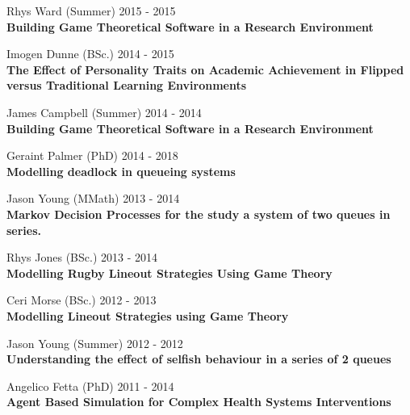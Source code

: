 \documentclass[10pt]{res} %
\begin{document}
\begin{resume}
\begin{etaremune}
\item
    Rhys Ward (Summer) \hfill 2015 -
    2015\\
\textbf{Building Game Theoretical Software in a Research Environment}\\

\item
    Imogen Dunne (BSc.) \hfill 2014 -
    2015\\
\textbf{The Effect of Personality Traits on Academic Achievement in Flipped versus Traditional Learning Environments}\\

\item
    James Campbell (Summer) \hfill 2014 -
    2014\\
\textbf{Building Game Theoretical Software in a Research Environment}\\

\item
    Geraint Palmer (PhD) \hfill 2014 -
    2018\\
\textbf{Modelling deadlock in queueing systems}\\

\item
    Jason Young (MMath) \hfill 2013 -
    2014\\
\textbf{Markov Decision Processes for the study a system of two queues in series.}\\

\item
    Rhys Jones (BSc.) \hfill 2013 -
    2014\\
\textbf{Modelling Rugby Lineout Strategies Using Game Theory}\\

\item
    Ceri Morse (BSc.) \hfill 2012 -
    2013\\
\textbf{Modelling Lineout Strategies using Game Theory}\\

\item
    Jason Young (Summer) \hfill 2012 -
    2012\\
\textbf{Understanding the effect of selfish behaviour in a series of 2 queues}\\

\item
    Angelico Fetta (PhD) \hfill 2011 -
    2014\\
\textbf{Agent Based Simulation for Complex Health Systems Interventions}\\


\end{etaremune}
\end{resume}
\end{document}
